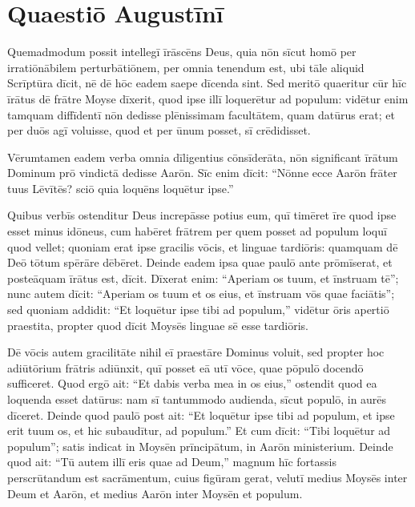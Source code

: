 \section{Quaestiō Augustīnī}

Quemadmodum possit intellegī īrāscēns\linebreak
Deus, quia nōn sīcut homō per irratiōnābilem perturbātiōnem, per omnia
tenendum est, ubi tāle aliquid Scrīptūra dīcit, nē dē hōc eadem saepe
dīcenda sint. Sed meritō quaeritur cūr hīc īrātus dē frātre Moyse
dīxerit, quod ipse illī loquerētur ad populum: vidētur enim tamquam
diffīdentī nōn dedisse plēnissimam facultātem, quam datūrus erat; et per 
duōs agī voluisse, quod et per ūnum posset, sī crēdidisset.

Vērumtamen
eadem verba omnia dīligentius cōnsīderāta, nōn significant īrātum
Dominum prō vindictā dedisse Aarōn. Sīc enim dīcit: ``Nōnne ecce Aarōn
frāter tuus Lēvītēs? sciō quia loquēns loquētur ipse.''

Quibus verbīs
ostenditur Deus increpāsse potius eum, quī timēret īre quod ipse esset
minus idōneus, cum habēret frātrem per quem posset ad populum loquī quod
vellet; quoniam erat ipse gracilis vōcis, et linguae tardiōris: quamquam
dē Deō tōtum spērāre dēbēret. Deinde eadem ipsa quae paulō ante
prōmīserat, et posteāquam īrātus est, dīcit. Dīxerat enim: ``Aperiam os
tuum, et īnstruam tē''; nunc autem dīcit: ``Aperiam os tuum et os eius, et
īnstruam vōs quae faciātis''; sed quoniam addidit: ``Et loquētur ipse tibi
ad populum,'' vidētur ōris apertiō praestita, propter quod dīcit Moysēs
linguae sē esse tardiōris. 

Dē vōcis autem gracilitāte nihil eī praestāre
Dominus voluit, sed propter hoc adiūtōrium frātris adiūnxit, quī posset
eā utī vōce, quae pōpulō docendō sufficeret. Quod ergō ait: ``Et dabis
verba mea in os eius,'' ostendit quod ea loquenda esset datūrus: nam sī
tantummodo audienda, sīcut populō, in aurēs dīceret. Deinde quod paulō
post ait: ``Et loquētur ipse tibi ad populum, et ipse erit tuum os, et hic
subaudītur, ad populum.'' Et cum dīcit: ``Tibi loquētur ad populum''; satis
indicat in Moysēn prīncipātum, in Aarōn ministerium. Deinde quod ait: ``Tū
autem illī eris quae ad Deum,'' magnum
hīc fortassis perscrūtandum 
est sacrāmentum, cuius figūram gerat, velutī medius Moysēs inter Deum et
Aarōn, et medius Aarōn inter Moysēn et populum. 

